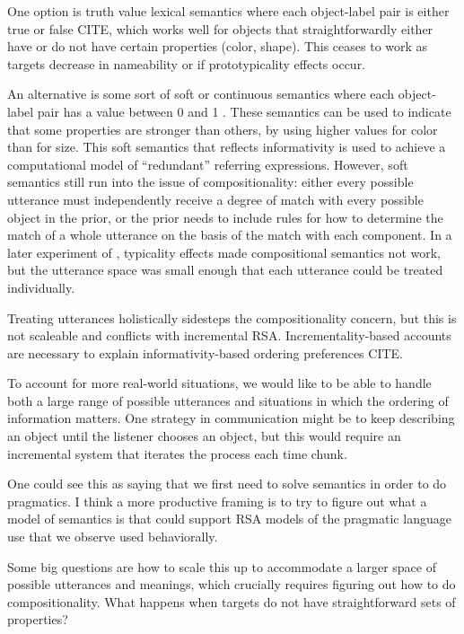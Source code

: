 \documentclass[]{article}
\begin{document}
One option is truth value lexical semantics where each object-label pair is either true or false CITE, which works well for objects that straightforwardly either have or do not have certain properties (color, shape). This ceases to work as targets decrease in nameability or if prototypicality effects occur. 

An alternative is some sort of soft or continuous semantics where each object-label pair has a value between 0 and 1 \cite{degen20200406}. These semantics can be used to indicate that some properties are stronger than others, by using higher values for color than for size. This soft semantics that reflects informativity is used to achieve a computational model of ``redundant'' referring expressions. %
However, soft semantics still run into the issue of compositionality: either every possible utterance must independently receive a degree of match with every possible object in the prior, or the prior needs to include rules for how to determine the match of a whole utterance on the basis of the match with each component. 
In a later experiment of \cite{degen20200406}, typicality effects made compositional semantics not work, but the utterance space was small enough that each utterance could be treated individually. 

Treating utterances holistically sidesteps the compositionality concern, but this is not scaleable and conflicts with incremental RSA. Incrementality-based accounts are necessary to explain informativity-based ordering preferences CITE. 

To account for more real-world situations, we would like to be able to handle both a large range of possible utterances and situations in which the ordering of information matters. One strategy in communication might be to keep describing an object until the listener chooses an object, but this would require an incremental system that iterates the process each time chunk.

One could see this as saying that we first need to solve semantics in order to do pragmatics. I think a more productive framing is to try to figure out what a model of semantics is that could support RSA models of the pragmatic language use that we observe used behaviorally. 


Some big questions are how to scale this up to accommodate a larger space of possible utterances and meanings, which crucially requires figuring out how to do compositionality. What happens when targets do not have straightforward sets of properties? 
\end{document}
